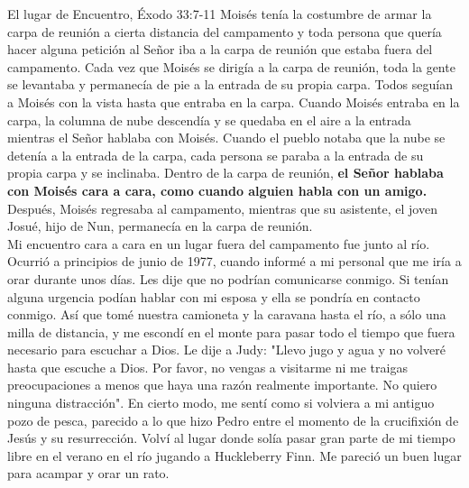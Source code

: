\documentclass[twoside, 12pt]{book}
\begin{document}
El lugar de Encuentro, Éxodo 33:7-11
Moisés tenía la costumbre de armar la carpa de reunión a cierta distancia del campamento y toda persona que quería hacer alguna petición al Señor iba a la carpa de reunión que estaba fuera del campamento. Cada vez que Moisés se dirigía a la carpa de reunión, toda la gente se levantaba y permanecía de pie a la entrada de su propia carpa. Todos seguían a Moisés con la vista hasta que entraba en la carpa. Cuando Moisés entraba en la carpa, la columna de nube descendía y se quedaba en el aire a la entrada mientras el Señor hablaba con Moisés. Cuando el pueblo notaba que la nube se detenía a la entrada de la carpa, cada persona se paraba a la entrada de su propia carpa y se inclinaba. Dentro de la carpa de reunión, \textbf{el Señor hablaba con Moisés cara a cara, como cuando alguien habla con un amigo.} Después, Moisés regresaba al campamento, mientras que su asistente, el joven Josué, hijo de Nun, permanecía en la carpa de reunión.\\

Mi encuentro cara a cara en un lugar fuera del campamento fue junto al río. Ocurrió a principios de junio de 1977, cuando informé a mi personal que me iría a orar durante unos días. Les dije que no podrían comunicarse conmigo. Si tenían alguna urgencia podían hablar con mi esposa y ella se pondría en contacto conmigo. Así que tomé nuestra camioneta y la caravana hasta el río, a sólo una milla de distancia, y me escondí en el monte para pasar todo el tiempo que fuera necesario para escuchar a Dios. Le dije a Judy: "Llevo jugo y agua y no volveré hasta que escuche a Dios. Por favor, no vengas a visitarme ni me traigas preocupaciones a menos que haya una razón realmente importante. No quiero ninguna distracción". En cierto modo, me sentí como si volviera a mi antiguo pozo de pesca, parecido a lo que hizo Pedro entre el momento de la crucifixión de Jesús y su resurrección. Volví al lugar donde solía pasar gran parte de mi tiempo libre en el verano en el río jugando a Huckleberry Finn. Me pareció un buen lugar para acampar y orar un rato.\\
\end{document}
